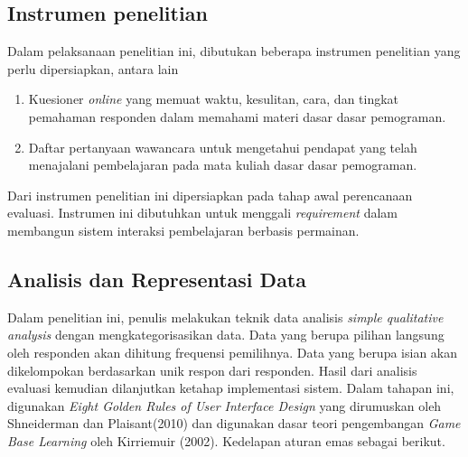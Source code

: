 	\subsection{Instrumen penelitian}
	
	Dalam pelaksanaan penelitian ini, dibutukan beberapa instrumen penelitian yang perlu dipersiapkan, antara lain
	
	\begin{enumerate}
		\item Kuesioner \textit{online} yang memuat waktu, kesulitan, cara, dan tingkat pemahaman responden dalam memahami materi dasar dasar pemograman.
		\item Daftar pertanyaan wawancara untuk mengetahui pendapat yang telah menajalani pembelajaran pada mata kuliah dasar dasar pemograman.
	\end{enumerate}

	Dari instrumen penelitian ini dipersiapkan pada tahap awal perencanaan evaluasi. Instrumen ini dibutuhkan untuk menggali \textit{requirement} dalam membangun sistem interaksi pembelajaran berbasis permainan.
	
	\subsection{Analisis dan Representasi Data}
	
	Dalam penelitian ini, penulis melakukan teknik data analisis \textit{simple qualitative analysis} dengan mengkategorisasikan data. Data yang berupa pilihan langsung oleh responden akan dihitung frequensi pemilihnya. Data yang berupa isian akan dikelompokan berdasarkan unik respon dari responden. 
	\linebreak\linebreak
	Hasil dari analisis evaluasi kemudian dilanjutkan ketahap implementasi sistem. Dalam tahapan ini, digunakan \textit{Eight Golden Rules of User Interface Design} yang dirumuskan oleh Shneiderman dan Plaisant(2010) dan digunakan dasar teori pengembangan \textit{Game Base Learning} oleh Kirriemuir (2002).
	\linebreak\linebreak
	Kedelapan aturan emas sebagai berikut.
	
